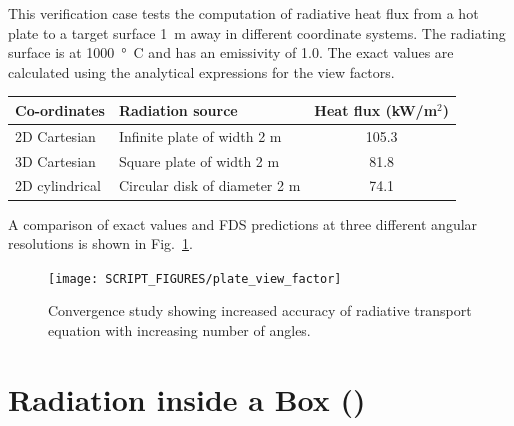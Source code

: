 \documentclass[11pt]{book}
\begin{document}
This verification case tests the computation of radiative heat flux from a hot plate to a target surface 1~m away in different coordinate systems. The radiating surface is at 1000~\si{\degree C} and has an emissivity of 1.0.  The exact values are calculated using the analytical expressions for the view factors.
\begin{center}
\begin{tabular}{|l|l|c|}
\hline Co-ordinates & Radiation source & Heat flux (kW/m$^2$)  \\ \hline \hline
2D Cartesian   & Infinite plate of width 2 m   & 105.3 \\
3D Cartesian   & Square plate of width 2 m     & 81.8 \\
2D cylindrical & Circular disk of diameter 2 m & 74.1 \\ \hline
\end{tabular}
\end{center}
A comparison of exact values and FDS predictions at three different angular resolutions is shown in Fig.~\ref{fig_plate_view_factor}.
\begin{figure}[ht]
\centering
\texttt{[image: SCRIPT\_FIGURES/plate\_view\_factor]}
\caption[The {\ct plate\_view\_factor} test case]{Convergence study showing increased accuracy of radiative transport equation with increasing number of angles.}
\label{fig_plate_view_factor}
\end{figure}



\section{Radiation inside a Box (\texorpdfstring{}{radiation\_in\_a\_box}) }
\label{radiation_in_a_box}
\label{radiation_box}
\end{document}
